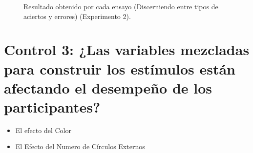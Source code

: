 \begin{figure}[th]
\caption[Resultados obtenidos por ensayo; Experimento 2]{Resultado obtenido por cada ensayo (Discerniendo entre tipos de aciertos y errores) (Experimento 2).}
\label{fig:Outcome_E2}
\end{figure}












\section{Control 3: ¿Las variables mezcladas para construir los estímulos están afectando el desempeño de los participantes?}

\begin{itemize}
\item El efecto del Color
\item El Efecto del Numero de Círculos Externos
\end{itemize}

